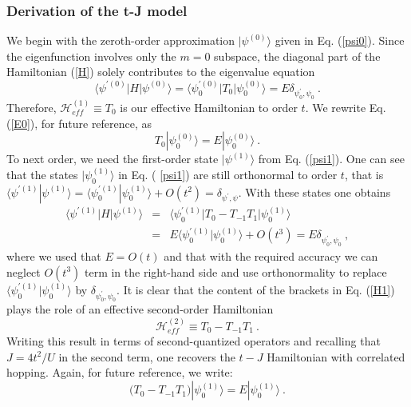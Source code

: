 \documentclass[floatfix,twocolumn,aps,prb,showpacs,superscriptaddress]{revtex4}
\begin{document}


\subsubsection{Derivation of the t-J model}


We begin with the zeroth-order approximation $|\psi ^{(0)}\rangle $ given in
Eq. (\ref{psi0}). Since the eigenfunction involves only the $m=0$ subspace,
the diagonal part of the Hamiltonian (\ref{H}) solely contributes to the
eigenvalue equation
\begin{equation}
\langle \psi ^{\prime (0)}|H|\psi ^{(0)}\rangle =\langle \psi _{0}^{\prime
(0)}|T_{0}|\psi _{0}^{(0)}\rangle =E\delta _{\psi _{0}^{\prime },\psi _{0}}\
.  \label{E0}
\end{equation}%
Therefore, $\mathcal{H}_{eff}^{(1)}\equiv T_{0}$ is our effective
Hamiltonian to order $t$. We rewrite Eq. (\ref{E0}), for future reference,
as
\begin{equation}
T_{0}|\psi _{0}^{(0)}\rangle =E|\psi _{0}^{(0)}\rangle \ .  \label{0}
\end{equation}%
To next order, we need the first-order state $|\psi ^{(1)}\rangle $ from Eq.
(\ref{psi1}). One can see that the states $|\psi _{0}^{(1)}\rangle $ in Eq. (%
\ref{psi1}) are still orthonormal to order $t$, that is $\langle \psi
^{\prime (1)}|\psi ^{(1)}\rangle =\langle \psi _{0}^{\prime (1)}|\psi
_{0}^{(1)}\rangle +O(t^{2})=\delta _{\psi ^{\prime },\psi }$. With these
states one obtains
\begin{eqnarray}
\langle \psi ^{\prime (1)}|H|\psi ^{(1)}\rangle  &=&\langle \psi
_{0}^{\prime (1)}|T_{0}-T_{-1}T_{1}|\psi _{0}^{(1)}\rangle   \label{H1} \\
&=&E\langle \psi _{0}^{\prime (1)}|\psi _{0}^{(1)}\rangle +O(t^{3})=E\delta
_{\psi _{0}^{\prime },\psi _{0}}\ ,  \nonumber
\end{eqnarray}%
where we used that $E=O(t)$ and that with the required accuracy we can
neglect $O(t^{3})$ term in the right-hand side and use orthonormality to
replace $\langle \psi _{0}^{\prime (1)}|\psi _{0}^{(1)}\rangle $ by $\delta
_{\psi _{0}^{\prime },\psi _{0}}$. It is clear that the content of the
brackets in Eq. (\ref{H1}) plays the role of an effective second-order
Hamiltonian
\begin{equation}
\mathcal{H}_{eff}^{(2)}\equiv T_{0}-T_{-1}T_{1}\ .  \label{h11}
\end{equation}%
Writing this result in terms of second-quantized operators and recalling
that $J=4t^{2}/U$ in the second term, one recovers the $t-J$ Hamiltonian
with correlated hopping. Again, for future reference, we write: 
\begin{equation}
\big(T_{0}-T_{-1}T_{1}\big)|\psi _{0}^{(1)}\rangle =E|\psi _{0}^{(1)}\rangle
\ .  \label{1}
\end{equation}
\end{document}
